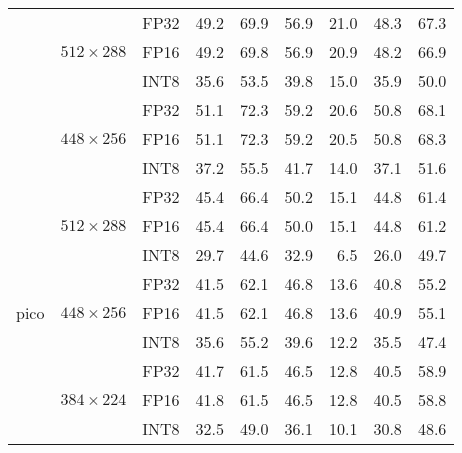\begin{appendices}
\begin{table}[t]
\begin{threeparttable}
\begin{tabular}{|c|c|c|rrrrrr|}
            \cline{2-9}
                                        & \multirow{3}{*}{$512\times288$}  & FP32 & 49.2 & 69.9 & 56.9 & 21.0 & 48.3 & 67.3 \\
                                        &                                  & FP16 & 49.2 & 69.8 & 56.9 & 20.9 & 48.2 & 66.9 \\
                                        &                                  & INT8 & 35.6 & 53.5 & 39.8 & 15.0 & 35.9 & 50.0 \\
            \cline{2-9}
                                        & \multirow{3}{*}{$448\times256$}  & FP32 & 51.1 & 72.3 & 59.2 & 20.6 & 50.8 & 68.1 \\
                                        &                                  & FP16 & 51.1 & 72.3 & 59.2 & 20.5 & 50.8 & 68.3 \\
                                        &                                  & INT8 & 37.2 & 55.5 & 41.7 & 14.0 & 37.1 & 51.6 \\
            \hline
            \multirow{9}{*}{pico}       & \multirow{3}{*}{$512\times288$}  & FP32 & 45.4 & 66.4 & 50.2 & 15.1 & 44.8 & 61.4 \\
                                        &                                  & FP16 & 45.4 & 66.4 & 50.0 & 15.1 & 44.8 & 61.2 \\
                                        &                                  & INT8 & 29.7 & 44.6 & 32.9 &  6.5 & 26.0 & 49.7 \\
            \cline{2-9}
                                        & \multirow{3}{*}{$448\times256$}  & FP32 & 41.5 & 62.1 & 46.8 & 13.6 & 40.8 & 55.2 \\
                                        &                                  & FP16 & 41.5 & 62.1 & 46.8 & 13.6 & 40.9 & 55.1 \\
                                        &                                  & INT8 & 35.6 & 55.2 & 39.6 & 12.2 & 35.5 & 47.4 \\
            \cline{2-9}
                                        & \multirow{3}{*}{$384\times224$}  & FP32 & 41.7 & 61.5 & 46.5 & 12.8 & 40.5 & 58.9 \\
                                        &                                  & FP16 & 41.8 & 61.5 & 46.5 & 12.8 & 40.5 & 58.8 \\
                                        &                                  & INT8 & 32.5 & 49.0 & 36.1 & 10.1 & 30.8 & 48.6 \\

\end{tabular}
\end{threeparttable}
\end{table}
\end{appendices}
